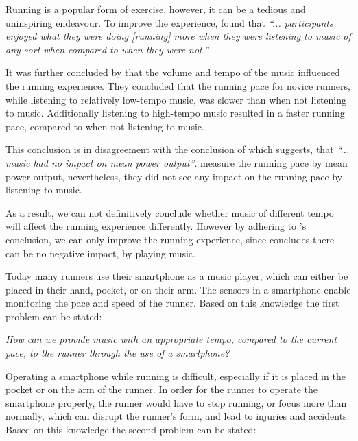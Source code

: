 Running is a popular form of exercise, however, it can be a tedious and uninspiring endeavour.
To improve the experience, \citet{musicRunEffectArticle} found that 
\textit{``... participants enjoyed what they were doing [running] more when they were listening to music of any sort when compared to when they were not.''}

It was further concluded by \citet{musicRunEffectArticle} that the volume and tempo of the music influenced the running experience.
They concluded that the running pace for novice runners, while listening to relatively low-tempo music, was slower than when not listening to music. Additionally listening to high-tempo music resulted in a faster running pace, compared to when not listening to music.

This conclusion is in disagreement with the conclusion of \citet{musicNoPerformanceEffect} which suggests, that \textit{``... music had no impact on mean power output''}. \citet{musicNoPerformanceEffect} measure the running pace by mean power output, nevertheless, they did not see any impact on the running pace by listening to music.

As a result, we can not definitively conclude whether music of different tempo will affect the running experience differently. 
However by adhering to \citet{musicRunEffectArticle}'s conclusion, we can only improve the running experience, since \citet{musicNoPerformanceEffect} concludes there can be no negative impact, by playing music.

Today many runners use their smartphone as a music player, which can either be placed in their hand, pocket, or on their arm.
The sensors in a smartphone enable monitoring the pace and speed of the runner.
Based on this knowledge the first problem can be stated:

\begin{center}
\textit{How can we provide music with an appropriate tempo, compared to the current pace, to the runner through the use of a smartphone?}
\end{center}

\noindent Operating a smartphone while running is difficult, especially if it is placed in the pocket or on the arm of the runner.
In order for the runner to operate the smartphone properly, the runner would have to stop running, or focus more than normally, which can disrupt the runner's form, and lead to injuries and accidents.
Based on this knowledge the second problem can be stated: 

